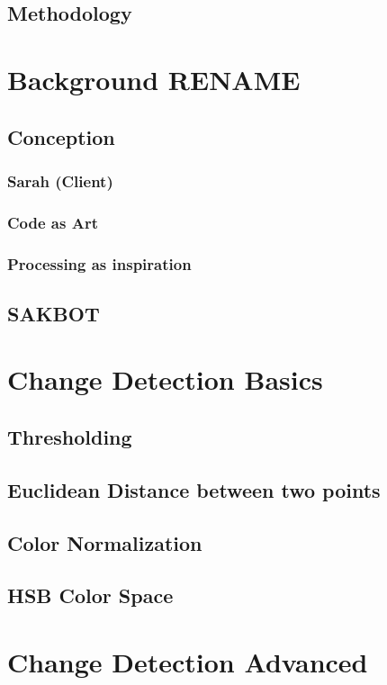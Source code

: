 \documentclass[a4paper]{report}
\begin{document}
\subsection{Methodology}

\section{Background RENAME}
\subsection{Conception}
\subsubsection{Sarah (Client)}
\subsubsection{Code as Art}
\subsubsection{Processing as inspiration}
\subsection{SAKBOT}

\section{Change Detection Basics}
\subsection{Thresholding}
\subsection{Euclidean Distance between two points}
\subsection{Color Normalization}
\subsection{HSB Color Space}

\section{Change Detection Advanced}
\end{document}
